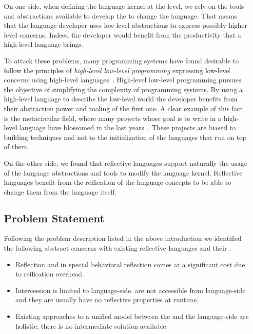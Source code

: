 On one side, when defining the language kernel at the \VM level, we rely on the tools and abstractions available to develop the \VM to change the language. That means that the language developer uses low-level abstractions to express possibly higher-level concerns. Indeed the developer would benefit from the productivity that a high-level language brings.

To attack these problems, many programming systems have found desirable to follow the principles of \emph{high-level low-level programming} \ie expressing low-level concerns using high-level languages~\cite{Fram09a}. High-level low-level programming pursues the objective of simplifying the complexity of programming systems. By using a high-level language to describe the low-level world the developer benefits from their abstraction power and tooling of the first one. A clear example of this fact is the metacircular \VM field, where many projects whose goal is to write \VMs in a high-level language have blossomed in the last years~\cite{Wimm13a,Alpe00a,Verw11a,Inga97a,Unga05a,Rigo06a}. These projects are biased to \VM building techniques and not to the initialization of the languages that run on top of them.

On the other side, we found that reflective languages support naturally the usage of the language abstractions and tools to modify the language kernel. Reflective languages benefit from the reification of the language concepts to be able to change them from the language itself.


\subsection{Problem Statement}

Following the problem description listed in the above introduction we identified the following abstract concerns with existing reflective languages and their \VMs.
%
\begin{itemize}
	\item Reflection and in special behavioral reflection comes at a significant cost due to reification overhead.
		
	\item Intercession is limited to language-side.
	\VMs are not accessible from language-side and they are usually have no reflective properties at runtime. 
	
	\item Existing approaches to a unified model between the \VM and the language-side are holistic, there is no intermediate solution available.
\end{itemize}

